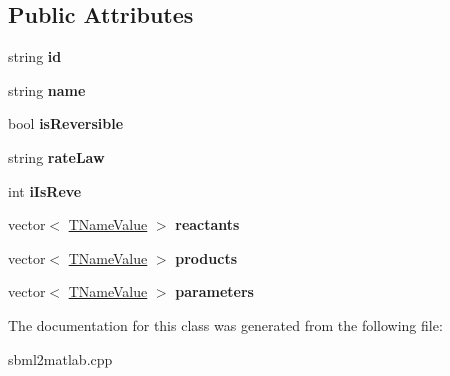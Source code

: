 \subsection*{Public Attributes}
\begin{DoxyCompactItemize}
\item 
\hypertarget{class_t_reaction_info_af957b7dd0ff891fd8ee6e008003bb45e}{string {\bfseries id}}\label{class_t_reaction_info_af957b7dd0ff891fd8ee6e008003bb45e}

\item 
\hypertarget{class_t_reaction_info_a56acb13abfc3dd5ec42c6f2b355b7351}{string {\bfseries name}}\label{class_t_reaction_info_a56acb13abfc3dd5ec42c6f2b355b7351}

\item 
\hypertarget{class_t_reaction_info_a164eceb81f9bf805a17be8f18b92172c}{bool {\bfseries is\-Reversible}}\label{class_t_reaction_info_a164eceb81f9bf805a17be8f18b92172c}

\item 
\hypertarget{class_t_reaction_info_a623dfd7428bef9aa8188d65228b0fe29}{string {\bfseries rate\-Law}}\label{class_t_reaction_info_a623dfd7428bef9aa8188d65228b0fe29}

\item 
\hypertarget{class_t_reaction_info_a1e778e410888f20f28b1208e840cd45e}{int {\bfseries i\-Is\-Reve}}\label{class_t_reaction_info_a1e778e410888f20f28b1208e840cd45e}

\item 
\hypertarget{class_t_reaction_info_a80922bb56f74759793a666778a63154d}{vector$<$ \hyperlink{struct_t_name_value}{T\-Name\-Value} $>$ {\bfseries reactants}}\label{class_t_reaction_info_a80922bb56f74759793a666778a63154d}

\item 
\hypertarget{class_t_reaction_info_a3daceb77af34c7bb7277ca2d4f57b9c7}{vector$<$ \hyperlink{struct_t_name_value}{T\-Name\-Value} $>$ {\bfseries products}}\label{class_t_reaction_info_a3daceb77af34c7bb7277ca2d4f57b9c7}

\item 
\hypertarget{class_t_reaction_info_ae8fbeead07d873ac6a47d150fcd84fa0}{vector$<$ \hyperlink{struct_t_name_value}{T\-Name\-Value} $>$ {\bfseries parameters}}\label{class_t_reaction_info_ae8fbeead07d873ac6a47d150fcd84fa0}

\end{DoxyCompactItemize}


The documentation for this class was generated from the following file\-:\begin{DoxyCompactItemize}
\item 
sbml2matlab.\-cpp\end{DoxyCompactItemize}

